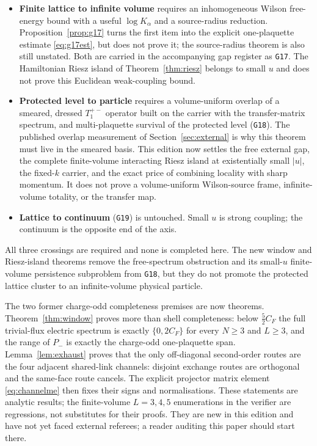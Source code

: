 \documentclass[11pt]{article}
\theoremstyle{plain}
\theoremstyle{definition}
\theoremstyle{remark}
\newcommand{\CF}{C_F}
\begin{document}
\begin{itemize}\itemsep2pt
\item \textbf{Finite lattice to infinite volume} requires an inhomogeneous
  Wilson free-energy bound with a useful $\log K_\alpha$ and a source-radius
  reduction. Proposition~\ref{prop:g17} turns the first item into the explicit
  one-plaquette estimate \eqref{eq:g17est}, but does not prove it; the
  source-radius theorem is also still unstated. Both are carried in the
  accompanying gap register as \texttt{G17}. The Hamiltonian Riesz island of
  Theorem~\ref{thm:riesz} belongs to small $u$ and does not prove this
  Euclidean weak-coupling bound.
\item \textbf{Protected level to particle} requires a volume-uniform overlap
  of a smeared, dressed $T_1^{+-}$ operator built on the carrier with the
  transfer-matrix spectrum, and multi-plaquette survival of the protected
  level (\texttt{G18}). The published overlap measurement of
  Section~\ref{sec:external} is why this theorem must live in the smeared
  basis. This edition now settles the free external gap, the complete
  finite-volume interacting Riesz island at existentially small $|u|$, the
  fixed-$k$ carrier, and the exact price of combining locality with sharp
  momentum. It does not prove a volume-uniform Wilson-source frame,
  infinite-volume totality, or the transfer map.
\item \textbf{Lattice to continuum} (\texttt{G19}) is untouched. Small $u$ is
  strong coupling; the continuum is the opposite end of the axis.
\end{itemize}

\noindent All three crossings are required and none is completed here. The new
window and Riesz-island theorems remove the free-spectrum obstruction and its
small-$u$ finite-volume persistence subproblem from \texttt{G18}, but they do
not promote the protected lattice cluster to an infinite-volume physical
particle.

The two former charge-odd completeness premises are now theorems.
Theorem~\ref{thm:window} proves more than shell completeness: below
$\tfrac52\CF$ the full trivial-flux electric spectrum is exactly $\{0,2\CF\}$
for every $N\ge3$ and $L\ge3$, and the range of $P_-$ is exactly the
charge-odd one-plaquette span. Lemma~\ref{lem:exhaust} proves that the only
off-diagonal second-order routes are the four adjacent shared-link channels:
disjoint exchange routes are orthogonal and the same-face route cancels. The
explicit projector matrix element \eqref{eq:channelme} then fixes their signs
and normalisations. These statements are analytic results; the finite-volume
$L=3,4,5$ enumerations in the verifier are regressions, not substitutes for
their proofs. They are new in this edition and have not yet faced external
referees; a reader auditing this paper should start there.
\end{document}

